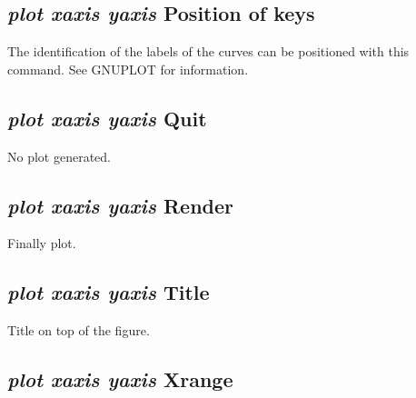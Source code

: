 \documentclass[12pt]{article}
\begin{document}
\subsection{{\em plot xaxis yaxis} Position of keys}

The identification of the labels of the curves can be positioned
with this command.  See GNUPLOT for information.

\subsection{{\em plot xaxis yaxis} Quit}

No plot generated.

\subsection{{\em plot xaxis yaxis} Render}

Finally plot.

\subsection{{\em plot xaxis yaxis} Title}

Title on top of the figure.

\subsection{{\em plot xaxis yaxis} Xrange}
\end{document}
